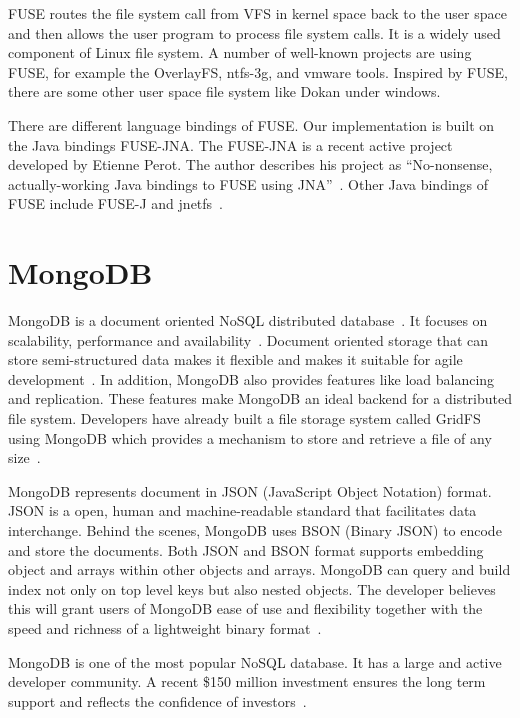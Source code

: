     FUSE routes the file system call from VFS in kernel space back to the user space and then allows the user program to process file system calls. It is a widely used component of Linux file system. A number of well-known projects are using FUSE, for example the OverlayFS, ntfs-3g, and vmware tools. Inspired by FUSE, there are some other user space file system like Dokan under windows.

    There are different language bindings of FUSE. Our implementation is built on the Java bindings FUSE-JNA. The FUSE-JNA is a recent active project developed by Etienne Perot. The author describes his project as ``No-nonsense, actually-working Java bindings to FUSE using JNA''~\cite{fusejna}. Other Java bindings of FUSE include FUSE-J and jnetfs~\cite{jnetfs}.

\section{MongoDB}

    MongoDB is a document oriented NoSQL distributed database~\cite{mongo_overview}. It focuses on scalability, performance and availability~\cite{mongo_overview}. Document oriented storage that can store semi-structured data makes it flexible and makes it suitable for agile development~\cite{docdb}. In addition, MongoDB also provides features like load balancing and replication. These features make MongoDB an ideal backend for a distributed file system. Developers have already built a file storage system called GridFS using MongoDB which provides a mechanism to store and retrieve a file of any size~\cite{gridfs}.

    MongoDB represents document in JSON (JavaScript Object Notation) format. JSON is a open, human and machine-readable standard that facilitates data interchange. Behind the scenes, MongoDB uses BSON (Binary JSON) to encode and store the documents. Both JSON and BSON format supports embedding object and arrays within other objects and arrays. MongoDB can query and build index not only on top level keys but also nested objects. The developer believes this will grant users of MongoDB ease of use and flexibility together with the speed and richness of a lightweight binary format~\cite{bson}.

    MongoDB is one of the most popular NoSQL database. It has a large and active developer community. A recent \$150 million investment ensures the long term support and reflects the confidence of investors~\cite{mongInvest}.

